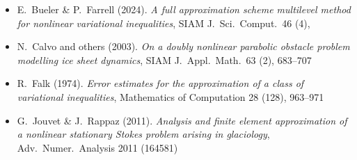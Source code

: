 \begin{itemize}
\item E.~Bueler \& P.~Farrell (2024).  \emph{A full approximation scheme multilevel method for nonlinear variational inequalities}, SIAM J.~Sci.~Comput.~46 (4), 
\item N.~Calvo and others (2003). \emph{On a doubly nonlinear parabolic obstacle problem modelling ice sheet dynamics}, SIAM J.~Appl.~Math.~63 (2), 683--707 
\item R.~Falk (1974).  \emph{Error estimates for the approximation of a class of variational inequalities}, Mathematics of Computation 28 (128), 963--971
\item G.~Jouvet \& J.~Rappaz (2011). \emph{Analysis and finite element approximation of a nonlinear stationary {S}tokes problem arising in glaciology}, Adv.~Numer.~Analysis 2011 (164581) 
\end{itemize}

